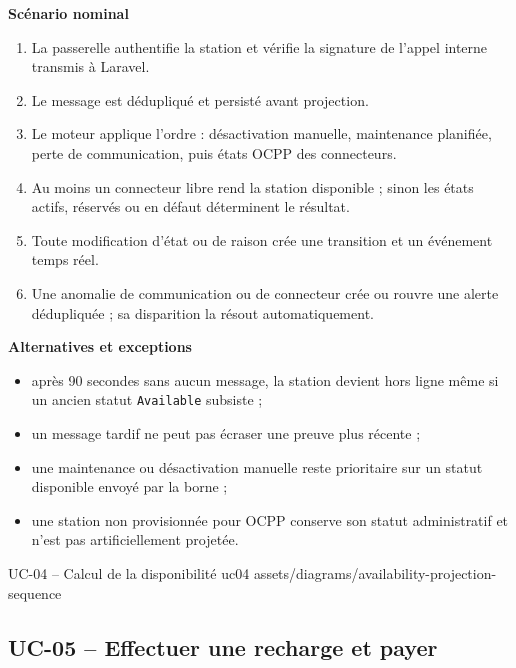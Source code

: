 \textbf{Scénario nominal}
\begin{enumerate}[leftmargin=8mm]
  \item La passerelle authentifie la station et vérifie la signature de l'appel
  interne transmis à Laravel.
  \item Le message est dédupliqué et persisté avant projection.
  \item Le moteur applique l'ordre : désactivation manuelle, maintenance planifiée,
  perte de communication, puis états OCPP des connecteurs.
  \item Au moins un connecteur libre rend la station disponible ; sinon les états
  actifs, réservés ou en défaut déterminent le résultat.
  \item Toute modification d'état ou de raison crée une transition et un événement
  temps réel.
  \item Une anomalie de communication ou de connecteur crée ou rouvre une alerte
  dédupliquée ; sa disparition la résout automatiquement.
\end{enumerate}

\textbf{Alternatives et exceptions}
\begin{itemize}[leftmargin=7mm]
  \item après 90 secondes sans aucun message, la station devient hors ligne même si
  un ancien statut \texttt{Available} subsiste ;
  \item un message tardif ne peut pas écraser une preuve plus récente ;
  \item une maintenance ou désactivation manuelle reste prioritaire sur un statut
  disponible envoyé par la borne ;
  \item une station non provisionnée pour OCPP conserve son statut administratif et
  n'est pas artificiellement projetée.
\end{itemize}

\UseCaseUmlPlate
  {UC-04 -- Calcul de la disponibilité}
  {uc04}
  {assets/diagrams/availability-projection-sequence}

\subsection{UC-05 -- Effectuer une recharge et payer}

